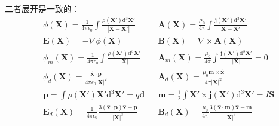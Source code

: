 \documentclass[12pt,onecolumn,a4paper]{book}
\numberwithin{table}{subsection}
\numberwithin{equation}{subsection}
\begin{document}
二者展开是一致的：
\begin{align}
     & \phi(\mathbf{X})          = \frac{1}{4\pi\epsilon_0} \int \frac{\rho(\mathbf{X}')\mathrm{d}^3\mathbf{X}'}{|\mathbf{X} - \mathbf{X}'|}         &
     & \mathbf{A}(\mathbf{X})    = \frac{\mu_0}{4\pi} \int \frac{\mathbf{j}(\mathbf{X}')\mathrm{d}^3\mathbf{X}'}{|\mathbf{X} - \mathbf{X}'|}           \\
     & \mathbf{E}(\mathbf{X})    = -\nabla \phi(\mathbf{X})                                                                                          &
     & \mathbf{B}(\mathbf{X})    = \nabla \times \mathbf{A}(\mathbf{X})                                                                                \\
     & \phi_m(\mathbf{X})        = \frac{1}{4\pi\epsilon_0} \int \frac{\rho(\mathbf{X}')\mathrm{d}^3\mathbf{X}'}{|\mathbf{X}|}                       &
     & \mathbf{A}_m(\mathbf{X})  = \frac{\mu_0}{4\pi} \int \frac{\mathbf{j}(\mathbf{X}')\mathrm{d}^3\mathbf{X}'}{|\mathbf{X}|} = 0                     \\
     & \phi_d(\mathbf{X})        = \frac{\mathbf{\hat{x}} \cdot \mathbf{p}}{4\pi\epsilon_0 |\mathbf{X}|^2}                                           &
     & \mathbf{A}_d(\mathbf{X})  = \frac{\mu_0 \mathbf{m} \times \mathbf{\hat{x}}}{4\pi |\mathbf{X}|^2}                                                \\
     & \mathbf{p}                = \int \rho(\mathbf{X}')\mathbf{X}'\mathrm{d}^3\mathbf{X}' = q\mathbf{d}                                            &
     & \mathbf{m}                = \frac{1}{2} \int \mathbf{X}' \times \mathbf{j}(\mathbf{X}')\mathrm{d}^3\mathbf{X}' = I\mathbf{S}                    \\
     & \mathbf{E}_d(\mathbf{X})  = \frac{1}{4\pi\epsilon_0} \frac{3(\mathbf{\hat{x}} \cdot \mathbf{p})\mathbf{\hat{x}} - \mathbf{p}}{|\mathbf{X}|^3} &
     & \mathbf{B}_d(\mathbf{X})  = \frac{\mu_0}{4\pi} \frac{3(\mathbf{\hat{x}} \cdot \mathbf{m})\mathbf{\hat{x}} - \mathbf{m}}{|\mathbf{X}|^3}
\end{align}
\end{document}
